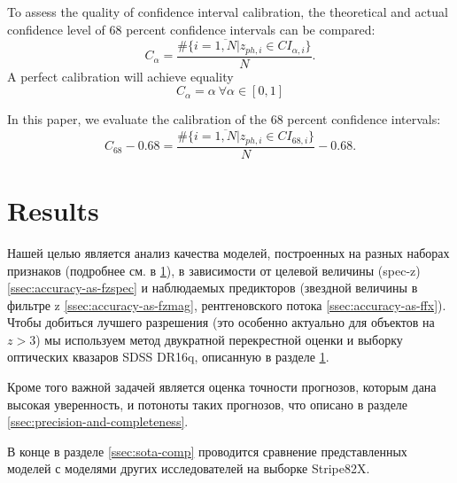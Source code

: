 \documentclass[fleqn,usenatbib]{mnras}
\begin{document}
To assess the quality of confidence interval calibration, the theoretical and actual confidence level of 68 percent confidence intervals can be compared:
\begin{equation}\label{eq:calpha}
    C_{\alpha} = \frac{\#\{i = \overline{1, N} | z_{ph,i} \in CI_{\alpha, i}\}}{N}.
\end{equation}
A perfect calibration will achieve equality
\begin{equation}\label{eq:perfect-ci}
    C_{\alpha} = \alpha ~ \forall \alpha \in [0, 1]
\end{equation}

In this paper, we evaluate the calibration of the 68 percent confidence intervals:
\begin{equation}\label{eq:c68}
    C_{68} - 0.68 = \frac{\#\{i = \overline{1, N} | z_{ph,i} \in CI_{68, i}\}}{N} - 0.68.
\end{equation}


\section{Results}

Нашей целью является анализ качества моделей, построенных на разных наборах признаков (подробнее см. в \ref{}), в зависимости от целевой величины (spec-z) \ref{ssec:accuracy-as-fzspec} и наблюдаемых предикторов (звездной величины в фильтре z \ref{ssec:accuracy-as-fzmag}, рентгеновского потока \ref{ssec:accuracy-as-ffx}). Чтобы добиться лучшего разрешения (это особенно актуально для объектов на $z > 3$) мы используем метод двукратной перекрестной оценки и выборку оптических квазаров SDSS DR16q, описанную в разделе \ref{}.

Кроме того важной задачей является оценка точности прогнозов, которым дана высокая уверенность, и потоноты таких прогнозов, что описано в разделе \ref{ssec:precision-and-completeness}.

В конце в разделе \ref{ssec:sota-comp} проводится сравнение представленных моделей с моделями других исследователей на выборке Stripe82X.

\end{document}
